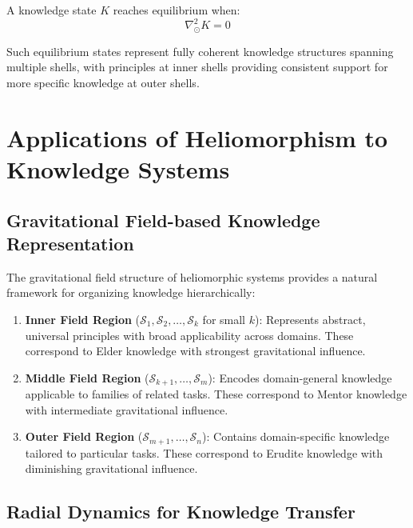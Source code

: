 \begin{definition}
\begin{theorem}
\begin{theorem}
A knowledge state $K$ reaches equilibrium when:
\begin{equation}
\nabla_{\odot}^2 K = 0
\end{equation}
\end{theorem}

Such equilibrium states represent fully coherent knowledge structures spanning multiple shells, with principles at inner shells providing consistent support for more specific knowledge at outer shells.

\section{Applications of Heliomorphism to Knowledge Systems}

\subsection{Gravitational Field-based Knowledge Representation}

The gravitational field structure of heliomorphic systems provides a natural framework for organizing knowledge hierarchically:

\begin{enumerate}
    \item \textbf{Inner Field Region} ($\mathcal{S}_1, \mathcal{S}_2, \dots, \mathcal{S}_k$ for small $k$): Represents abstract, universal principles with broad applicability across domains. These correspond to Elder knowledge with strongest gravitational influence.
    
    \item \textbf{Middle Field Region} ($\mathcal{S}_{k+1}, \dots, \mathcal{S}_{m}$): Encodes domain-general knowledge applicable to families of related tasks. These correspond to Mentor knowledge with intermediate gravitational influence.
    
    \item \textbf{Outer Field Region} ($\mathcal{S}_{m+1}, \dots, \mathcal{S}_n$): Contains domain-specific knowledge tailored to particular tasks. These correspond to Erudite knowledge with diminishing gravitational influence.
\end{enumerate}

\subsection{Radial Dynamics for Knowledge Transfer}


\end{theorem}
\end{definition}
